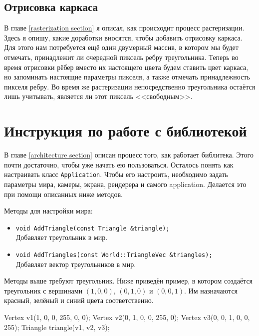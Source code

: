 \documentclass{article}
\begin{document}
\subsection{Отрисовка каркаса}

В главе \ref{rasterization section} я описал, как происходит процесс растеризации.
Здесь я опишу, какие доработки вносятся, чтобы добавить отрисовку каркаса.
Для этого нам потребуется ещё один двумерный массив, в котором мы будет отмечать, принадлежит ли очередной пиксель ребру треугольника.
Теперь во время отрисовки рёбер вместо их настоящего цвета будем ставить цвет каркаса, но запоминать настоящие параметры пикселя, а также отмечать принадлежность пикселя ребру.
Во время же растеризации непосредственно треугольника остаётся лишь учитывать, является ли этот пиксель <<свободным>>.

\newpage

\section{Инструкция по работе с библиотекой} \label{instruction section}

В главе \ref{architecture section} описан процесс того, как работает библитека.
Этого почти достаточно, чтобы уже начать ею пользоваться.
Осталось понять как настраивать класс \verb"Application".
Чтобы его настроить, необходимо задать параметры мира, камеры, экрана, рендерера и самого application.
Делается это при помощи описанных ниже методов.

Методы для настройки мира:
\begin{itemize}
	\item \verb"void AddTriangle(const Triangle &triangle);" \\
	Добавляет треугольник в мир.
	\item \verb"void AddTriangles(const World::TriangleVec &triangles);" \\
	Добавляет вектор треугольников в мир.
\end{itemize}

Методы выше требуют треугольник.
Ниже приведён пример, в котором создаётся треугольник с вершинами $(1, 0, 0)$, $(0, 1, 0)$ и $(0, 0, 1)$.
Им назначаются красный, зелёный и синий цвета соответственно.

\begin{cppcode}
  Vertex v1({1, 0, 0}, {255, 0, 0});
  Vertex v2({0, 1, 0}, {0, 255, 0});
  Vertex v3({0, 0, 1}, {0, 0, 255});
  Triangle triangle(v1, v2, v3);
\end{cppcode}
\end{document}
